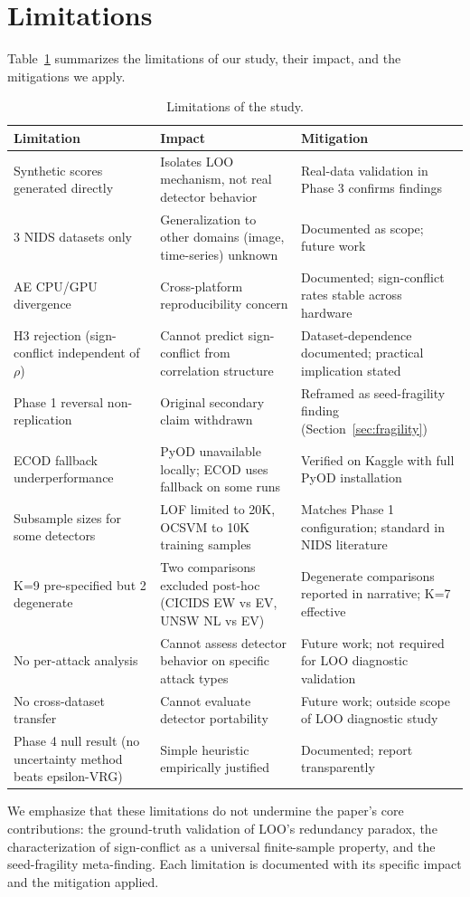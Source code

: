 \section{Limitations}
\label{sec:limitations}

Table~\ref{tab:limitations} summarizes the limitations of our study, their impact, and the mitigations we apply.

\begin{table}[h]
\centering
\caption{Limitations of the study.}
\label{tab:limitations}
\begin{tabular}{p{4cm}p{5cm}p{5cm}}
\toprule
\textbf{Limitation} & \textbf{Impact} & \textbf{Mitigation} \\
\midrule
Synthetic scores generated directly & Isolates LOO mechanism, not real detector behavior & Real-data validation in Phase 3 confirms findings \\
\midrule
3 NIDS datasets only & Generalization to other domains (image, time-series) unknown & Documented as scope; future work \\
\midrule
AE CPU/GPU divergence & Cross-platform reproducibility concern & Documented; sign-conflict rates stable across hardware \\
\midrule
H3 rejection (sign-conflict independent of $\rho$) & Cannot predict sign-conflict from correlation structure & Dataset-dependence documented; practical implication stated \\
\midrule
Phase 1 reversal non-replication & Original secondary claim withdrawn & Reframed as seed-fragility finding (Section~\ref{sec:fragility}) \\
\midrule
ECOD fallback underperformance & PyOD unavailable locally; ECOD uses fallback on some runs & Verified on Kaggle with full PyOD installation \\
\midrule
Subsample sizes for some detectors & LOF limited to 20K, OCSVM to 10K training samples & Matches Phase 1 configuration; standard in NIDS literature \\
\midrule
K=9 pre-specified but 2 degenerate & Two comparisons excluded post-hoc (CICIDS EW vs EV, UNSW NL vs EV) & Degenerate comparisons reported in narrative; K=7 effective \\
\midrule
No per-attack analysis & Cannot assess detector behavior on specific attack types & Future work; not required for LOO diagnostic validation \\
\midrule
No cross-dataset transfer & Cannot evaluate detector portability & Future work; outside scope of LOO diagnostic study \\
\midrule
Phase 4 null result (no uncertainty method beats epsilon-VRG) & Simple heuristic empirically justified & Documented; report transparently \\
\bottomrule
\end{tabular}
\end{table}

We emphasize that these limitations do not undermine the paper's core contributions: the ground-truth validation of LOO's redundancy paradox, the characterization of sign-conflict as a universal finite-sample property, and the seed-fragility meta-finding. Each limitation is documented with its specific impact and the mitigation applied.
